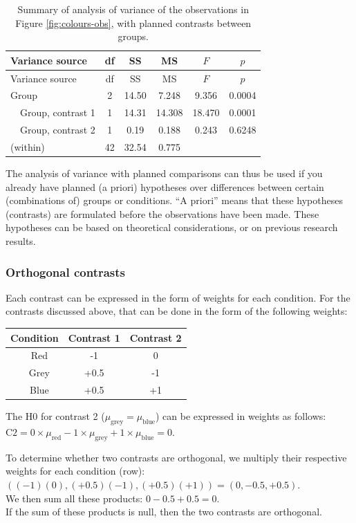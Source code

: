 \documentclass[
]{book}
\begin{document}
\begin{longtable}[]{@{}lccccc@{}}
\caption{\label{tab:colours-anova-contrast} Summary of analysis of variance of the observations in Figure \ref{fig:colours-obs}, with planned contrasts between groups.}\tabularnewline
\toprule
Variance source & df & SS & MS & \(F\) & \(p\)\tabularnewline
\midrule
\endfirsthead
\toprule
Variance source & df & SS & MS & \(F\) & \(p\)\tabularnewline
\midrule
\endhead
Group & 2 & 14.50 & 7.248 & 9.356 & 0.0004\tabularnewline
~~Group, contrast 1 & 1 & 14.31 & 14.308 & 18.470 & 0.0001\tabularnewline
~~Group, contrast 2 & 1 & 0.19 & 0.188 & 0.243 & 0.6248\tabularnewline
(within) & 42 & 32.54 & 0.775 & &\tabularnewline
\bottomrule
\end{longtable}

The analysis of variance with planned comparisons can thus be used
if you already have planned (a priori) hypotheses over differences between
certain (combinations of) groups or conditions. ``A priori'' means that these
hypotheses (contrasts) are formulated before the observations have been made.
These hypotheses can be based on theoretical considerations, or on
previous research results.

\hypertarget{orthogonal-contrasts}{%
\subsubsection{Orthogonal contrasts}\label{orthogonal-contrasts}}

Each contrast can be expressed in the form of weights for each
condition. For the contrasts discussed above, that can be done
in the form of the following weights:

\begin{longtable}[]{@{}ccc@{}}
\toprule
Condition & Contrast 1 & Contrast 2\tabularnewline
\midrule
\endhead
~~Red & -1 & 0\tabularnewline
~~Grey & +0.5 & -1\tabularnewline
~~Blue & +0.5 & +1\tabularnewline
\bottomrule
\end{longtable}

The H0 for contrast 2 (\(\mu_\textrm{grey} = \mu_\textrm{blue}\)) can be
expressed in weights as follows:
\(\textrm{C2} = 0\times \mu_\textrm{red} -1 \times \mu_\textrm{grey} +1 \times \mu_\textrm{blue} = 0\).

To determine whether two contrasts are orthogonal, we multiply
their respective weights for each condition (row):\\
\(( (-1)(0), (+0.5)(-1), (+0.5)(+1) )= (0, -0.5, +0.5)\).\\
We then sum all these products:
\(0 -0.5 + 0.5 = 0\).\\
If the sum of these products is null, then the two
contrasts are orthogonal.
\end{document}
